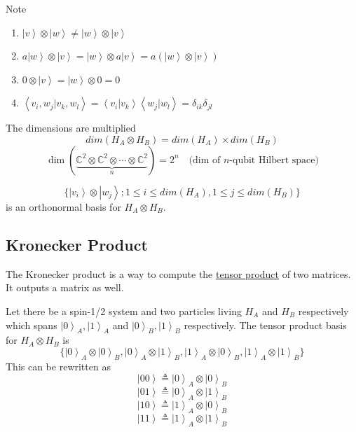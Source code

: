 \documentclass[
]{article}
\let\oldhyperref\hyperref
\renewcommand{\hyperref}[2][]{\oldhyperref[#1]{\underline{#2}}}
\providecommand{\ket}[1]{\left\lvert #1 \right\rangle}
\providecommand{\braket}[1]{\left\langle #1 \right\rangle}
\begin{document}
Note
\begin{enumerate}
	\item $\ket{v}\otimes\ket{w}\neq\ket{w}\otimes\ket{v}$
	\item $a\ket{w}\otimes\ket{v}=\ket{w}\otimes a\ket{v}=a(\ket{w}\otimes\ket{v})$
	\item $0\otimes\ket{v}=\ket{w}\otimes 0 = 0$
	\item $\braket{v_i, w_{j} | v_k, w_l}=\braket{v_i | v_k}\braket{w_j | w_l}=\delta_{ik}\delta_{jl}$
\end{enumerate}

The dimensions are multiplied
\[
	dim(H_A\otimes H_B)=dim(H_A)\times dim(H_B)
\]
\[
	\dim(\underbrace{\mathbb{C}^2 \otimes \mathbb{C}^2 \otimes \cdots \otimes \mathbb{C}^2}_{n}) = 2^n \quad \text{(dim of } n\text{-qubit Hilbert space)}
\]

\[
	\{\ket{v_i}\otimes\ket{w_j}; 1\leq i \leq dim(H_A), 1\leq j \leq dim(H_B)\}
\]
is an orthonormal basis for $H_A\otimes H_B$.

\subsection{Kronecker Product}\label{kronecker-product}
The Kronecker product is a way to compute the \hyperref[tensor-product]{tensor product} of two matrices. It outputs a matrix as well.

Let there be a spin-1/2 system and two particles living $H_A$ and $H_B$ respectively which spans $\ket{0}_A, \ket{1}_A$ and $\ket{0}_B, \ket{1}_B$ respectively.
The tensor product basis for $H_A\otimes H_B$ is
\[
	\{\ket{0}_A\otimes\ket{0}_B, \ket{0}_A\otimes\ket{1}_B, \ket{1}_A\otimes\ket{0}_B, \ket{1}_A\otimes\ket{1}_B\}
\]
This can be rewritten as
\[
	\ket{00}\triangleq\ket{0}_A\otimes\ket{0}_B
\]
\[
	\ket{01}\triangleq\ket{0}_A\otimes\ket{1}_B
\]
\[
	\ket{10}\triangleq\ket{1}_A\otimes\ket{0}_B
\]
\[
	\ket{11}\triangleq\ket{1}_A\otimes\ket{1}_B
\]
\end{document}
